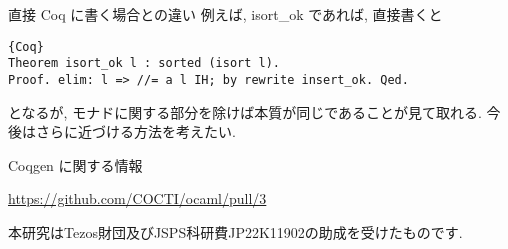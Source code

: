 \documentclass[unicode,mathserif]{beamer}
\begin{document}
\begin{frame}[fragile]
\begin{columns}[T]
\begin{column}{0.33\columnwidth}
\begin{block}{直接 Coq に書く場合との違い}
        例えば, isort\_ok であれば, 直接書くと 
        \begin{lstlisting}{Coq}
Theorem isort_ok l : sorted (isort l).
Proof. elim: l => //= a l IH; by rewrite insert_ok. Qed.  \end{lstlisting}
        となるが, モナドに関する部分を除けば本質が同じであることが見て取れる. 
        今後はさらに近づける方法を考えたい. 
      \end{block}
        Coqgen に関する情報
        \begin{center}
        \url{https://github.com/COCTI/ocaml/pull/3}
        \end{center}
        本研究はTezos財団及びJSPS科研費JP22K11902の助成を受けたものです. 
    \end{column}
  \end{columns}
 \end{frame}
\end{document}
